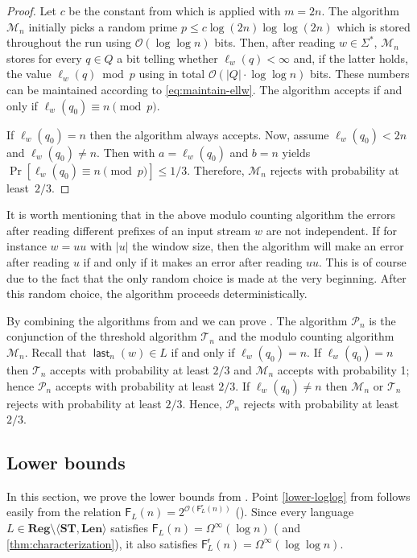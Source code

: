\documentclass{article}\usepackage[a4paper,margin=20mm]{geometry}
\newcommand{\M}{\mathcal{M}}
\renewcommand{\O}{\mathcal{O}}
\renewcommand{\P}{\mathcal{P}}
\newcommand{\F}{\mathsf{F}}
\renewcommand{\r}{\mathsf{r}}
\DeclareMathOperator{\last}{\mathsf{last}}
\newcommand{\Reg}{\mathbf{Reg}}
\newcommand{\Len}{\mathbf{Len}}
\newcommand{\ST}{\mathbf{ST}}
\renewcommand{\leq}{\leqslant}
\newcommand{\Omegainf}{\Omega^{\scriptscriptstyle{\infty}}}
\begin{document}
\begin{proof}
Let $c$ be the constant from  which is applied with $m = 2n$.
The algorithm $\M_n$ initially picks a random prime $p   \leq c \log(2n) \log \log(2n)$
which is stored throughout the run using $\O(\log \log n)$ bits.
Then, after reading  $w \in \Sigma^*$, $\M_n$ stores for every $q \in Q$ a bit telling whether
$\ell_w(q) < \infty$ and, if the latter holds,
the value $\ell_w(q) \bmod p$ using in total $\O(|Q| \cdot \log \log n)$ bits.
These numbers can be maintained according to \eqref{eq:maintain-ellw}.
The algorithm accepts if and only if $\ell_w(q_0) \equiv n \pmod p$.

If $\ell_w(q_0) = n$ then the algorithm always accepts.
Now, assume $\ell_w(q_0) < 2n$ and $\ell_w(q_0) \neq n$.
Then   with $a = \ell_w(q_0)$ and $b = n$ yields
$\Pr[\ell_w(q_0) \equiv n \pmod p] \leq 1/3$.
Therefore, $\M_n$ rejects with probability at least~$2/3$.
\end{proof}
It is worth mentioning that in the above modulo counting algorithm
the errors after reading different prefixes of an input stream $w$ are not independent.
If for instance $w = uu$ with $|u|$ the window size, then the algorithm will make an
 error after reading $u$ if and only if it makes an error after reading $uu$.
 This is of course due to the fact that the only random
choice is made at the very beginning. After this random choice, the algorithm proceeds deterministically.


By combining the algorithms from  and   we can prove .
The algorithm $\P_n$ is the conjunction of the threshold algorithm $\mathcal{T}_n$
and the modulo counting algorithm~$\M_n$.
Recall that $\last_n(w) \in L$ if and only if $\ell_{w}(q_0) = n$.
If $\ell_{w}(q_0) = n$ then $\mathcal{T}_n$ accepts with probability at least $2/3$ and
$\M_n$ accepts with probability 1; hence $\P_n$ accepts with probability at least $2/3$.
If $\ell_{w}(q_0) \neq n$ then $\M_n$ or $\mathcal{T}_n$ rejects with probability at least $2/3$.
Hence, $\P_n$ rejects with probability at least~$2/3$.

\subsection{Lower bounds} \label{sec-CC}

In this section, we prove the lower bounds from .
Point \ref{lower-loglog} from  follows easily from
the relation $\F_L(n) = 2^{\O(\F^\r_L(n))}$ ().
Since every language $L \in \Reg \setminus \langle \ST, \Len \rangle$
satisfies $\F_L(n) = \Omegainf(\log n)$
( and \ref{thm:characterization}),
it also satisfies $\F^\r_L(n) = \Omegainf(\log \log n)$.
\end{document}
